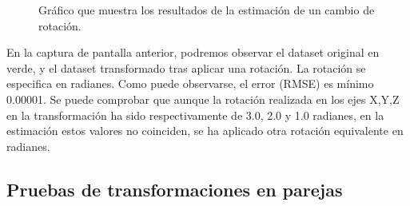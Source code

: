 \begin{figure}[H]
\begin{center}
\hspace{0.5cm}

\end{center}

\caption{Gráfico que muestra los resultados de la estimación de un cambio de rotación.}
\end{figure}

En la captura de pantalla anterior, podremos observar el dataset original en verde, y el dataset transformado tras aplicar una rotación. La rotación se especifica en radianes. Como puede observarse, el error (RMSE) es mínimo 0.00001. Se puede comprobar que aunque la rotación realizada en los ejes X,Y,Z en la transformación ha sido respectivamente de 3.0, 2.0 y 1.0 radianes, en la estimación estos valores no coinciden, se ha aplicado otra rotación equivalente en radianes.



\subsection{Pruebas de transformaciones en parejas}

